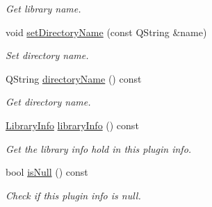 \begin{DoxyCompactItemize}
\begin{DoxyCompactList}\small\item\em Get library name. \end{DoxyCompactList}\item 
void \hyperlink{class_mdt_1_1_deploy_utils_1_1_qt_plugin_info_a94e67a8a486d6fd5466f350d0970535d}{set\+Directory\+Name} (const Q\+String \&name)
\begin{DoxyCompactList}\small\item\em Set directory name. \end{DoxyCompactList}\item 
Q\+String \hyperlink{class_mdt_1_1_deploy_utils_1_1_qt_plugin_info_a6c5d445b6d51317dd071fa599c958f86}{directory\+Name} () const 
\begin{DoxyCompactList}\small\item\em Get directory name. \end{DoxyCompactList}\item 
\hyperlink{class_mdt_1_1_deploy_utils_1_1_library_info}{Library\+Info} \hyperlink{class_mdt_1_1_deploy_utils_1_1_qt_plugin_info_a2a2ebd4450a1999e51272611a8d8d561}{library\+Info} () const \hypertarget{class_mdt_1_1_deploy_utils_1_1_qt_plugin_info_a2a2ebd4450a1999e51272611a8d8d561}{}\label{class_mdt_1_1_deploy_utils_1_1_qt_plugin_info_a2a2ebd4450a1999e51272611a8d8d561}

\begin{DoxyCompactList}\small\item\em Get the library info hold in this plugin info. \end{DoxyCompactList}\item 
bool \hyperlink{class_mdt_1_1_deploy_utils_1_1_qt_plugin_info_a1780c582b73ea3f9eadd6c84d037f1c9}{is\+Null} () const \hypertarget{class_mdt_1_1_deploy_utils_1_1_qt_plugin_info_a1780c582b73ea3f9eadd6c84d037f1c9}{}\label{class_mdt_1_1_deploy_utils_1_1_qt_plugin_info_a1780c582b73ea3f9eadd6c84d037f1c9}

\begin{DoxyCompactList}\small\item\em Check if this plugin info is null. \end{DoxyCompactList}\end{DoxyCompactItemize}
